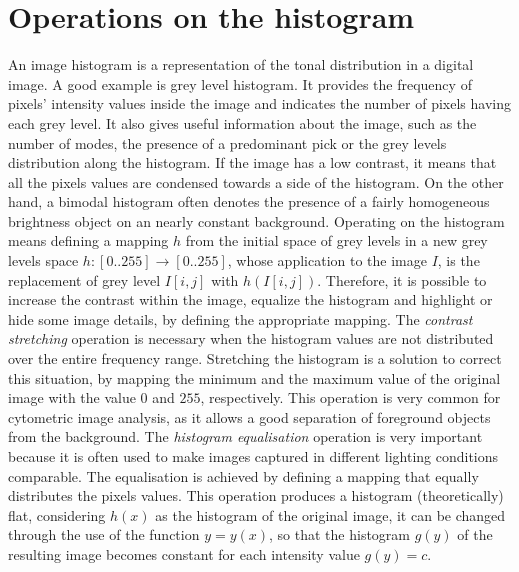 \documentclass[final,a4paper,12pt,english]{UnicaPhdThesis3}
\begin{document}
	\section{Operations on the histogram}\label{histop} %
	An image histogram is a representation of the tonal distribution in a digital image. A good example is grey level histogram. It provides the frequency of pixels' intensity values inside the image and indicates the number of pixels having each grey level. 
	It also gives useful information about the image, such as the number of modes, the presence of a predominant pick or the grey levels distribution along the histogram. If the image has a low contrast, it means that all the pixels values ​are condensed towards a side of the histogram. On the other hand, a bimodal histogram often denotes the presence of a fairly homogeneous brightness object on an nearly constant background. Operating on the histogram means defining a mapping $h$ from the initial space of grey levels in a new grey levels space $h: [0..255] \rightarrow [0..255]$, whose application to the image $I$, is the replacement of grey level $I[i, j]$ with $h(I[i, j])$. Therefore, it is possible to increase the contrast within the image, equalize the histogram and highlight or hide some image details, by defining the appropriate mapping.
	The \textit{contrast stretching} operation is necessary when the histogram values are not distributed over the entire frequency range. Stretching the histogram is a solution to correct this situation, by mapping the minimum and the maximum value of the original image with the value $0$ and $255$, respectively. This operation is very common for cytometric image analysis, as it allows a good separation of foreground objects from the background.
	The \textit{histogram equalisation} operation is very important because it is often used to make images captured in different lighting conditions comparable. The equalisation is achieved by defining a mapping that equally distributes the pixels values. This operation produces a histogram (theoretically) flat, considering $h(x)$ as the histogram of the original image, it can be changed through the use of the function $y = y(x)$, so that the histogram $g(y)$ of the resulting image becomes constant for each intensity value $g(y) = c$.
	
\end{document}
